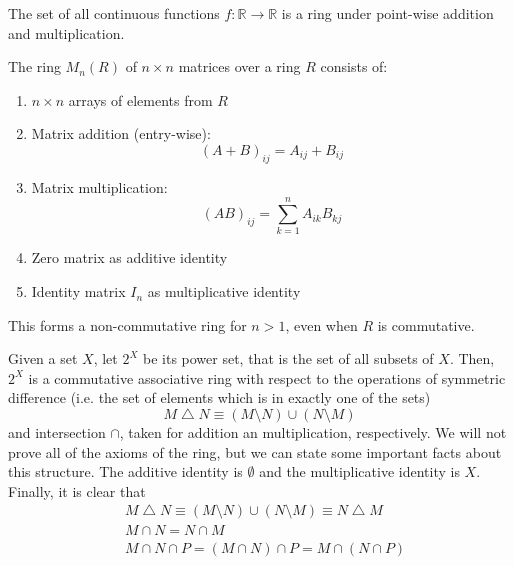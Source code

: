   \begin{example}
    The set of all continuous functions $f: \mathbb{R} \rightarrow \mathbb{R}$ is a ring under point-wise addition and multiplication. 
  \end{example}

  \begin{example}[Matrices]
    The ring $M_n(R)$ of $n \times n$ matrices over a ring $R$ consists of:
    \begin{enumerate}
      \item $n \times n$ arrays of elements from $R$
      \item Matrix addition (entry-wise):
      \begin{equation}
        (A + B)_{ij} = A_{ij} + B_{ij}
      \end{equation}
      \item Matrix multiplication:
      \begin{equation}
        (AB)_{ij} = \sum_{k=1}^n A_{ik}B_{kj}
      \end{equation}
      \item Zero matrix as additive identity
      \item Identity matrix $I_n$ as multiplicative identity
    \end{enumerate}
    This forms a non-commutative ring for $n > 1$, even when $R$ is commutative.
  \end{example}

  \begin{example}
    Given a set $X$, let $2^X$ be its power set, that is the set of all subsets of $X$. Then, $2^X$ is a commutative associative ring with respect to the operations of symmetric difference (i.e. the set of elements which is in exactly one of the sets) 
    \begin{equation}
      M \bigtriangleup N \equiv (M \setminus N) \cup (N \setminus M)
    \end{equation}
    and intersection $\cap$, taken for addition an multiplication, respectively. We will not prove all of the axioms of the ring, but we can state some important facts about this structure. The additive identity is $\emptyset$ and the multiplicative identity is $X$. Finally, it is clear that 
    \begin{align*}
      & M \bigtriangleup N \equiv (M \setminus N) \cup (N \setminus M) \equiv N \bigtriangleup M \\
      & M \cap N = N \cap M \\
      & M \cap N \cap P = (M \cap N) \cap P = M \cap (N \cap P)
    \end{align*}
  \end{example}


